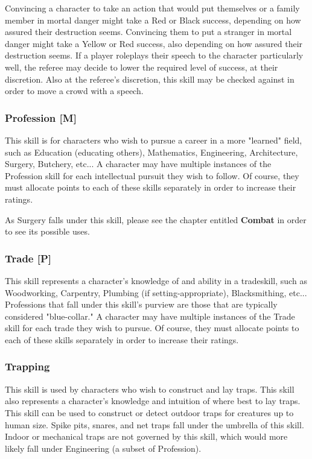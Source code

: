 \documentclass[oneside]{book}
\begin{document}
\begin{multicols}{2}
Convincing a character to take an action that would put themselves or a family member in mortal danger might take a Red or Black success, depending on how assured their destruction seems. Convincing them to put a stranger in mortal danger might take a Yellow or Red success, also depending on how assured their destruction seems. 
If a player roleplays their speech to the character particularly well, the referee may decide to lower the required level of success, at their discretion. Also at the referee's discretion, this skill may be checked against in order to move a crowd with a speech.

\subsubsection{Profession [M]}
This skill is for characters who wish to pursue a career in a more "learned" field, such as Education (educating others), Mathematics, Engineering, Architecture, Surgery, Butchery, etc... A character may have multiple instances of the Profession skill for each intellectual pursuit they wish to follow. Of course, they must allocate points to each of these skills separately in order to increase their ratings. 

As Surgery falls under this skill, please see the chapter entitled \textbf{Combat} in order to see its possible uses. 


\subsubsection{Trade [P]}
This skill represents a character's knowledge of and ability in a tradeskill, such as Woodworking, Carpentry, Plumbing (if setting-appropriate), Blacksmithing, etc... Professions that fall under this skill's purview are those that are typically considered "blue-collar."  A character may have multiple instances of the Trade skill for each trade they wish to pursue. Of course, they must allocate points to each of these skills separately in order to increase their ratings. 

\subsubsection{Trapping}
This skill is used by characters who wish to construct and lay traps. This skill also represents a character's knowledge and intuition of where best to lay traps. This skill can be used to construct or detect outdoor traps for creatures up to human size. Spike pits, snares, and net traps fall under the umbrella of this skill. Indoor or mechanical traps are not governed by this skill, which would more likely fall under Engineering (a subset of Profession).


\end{multicols}
\end{document}
